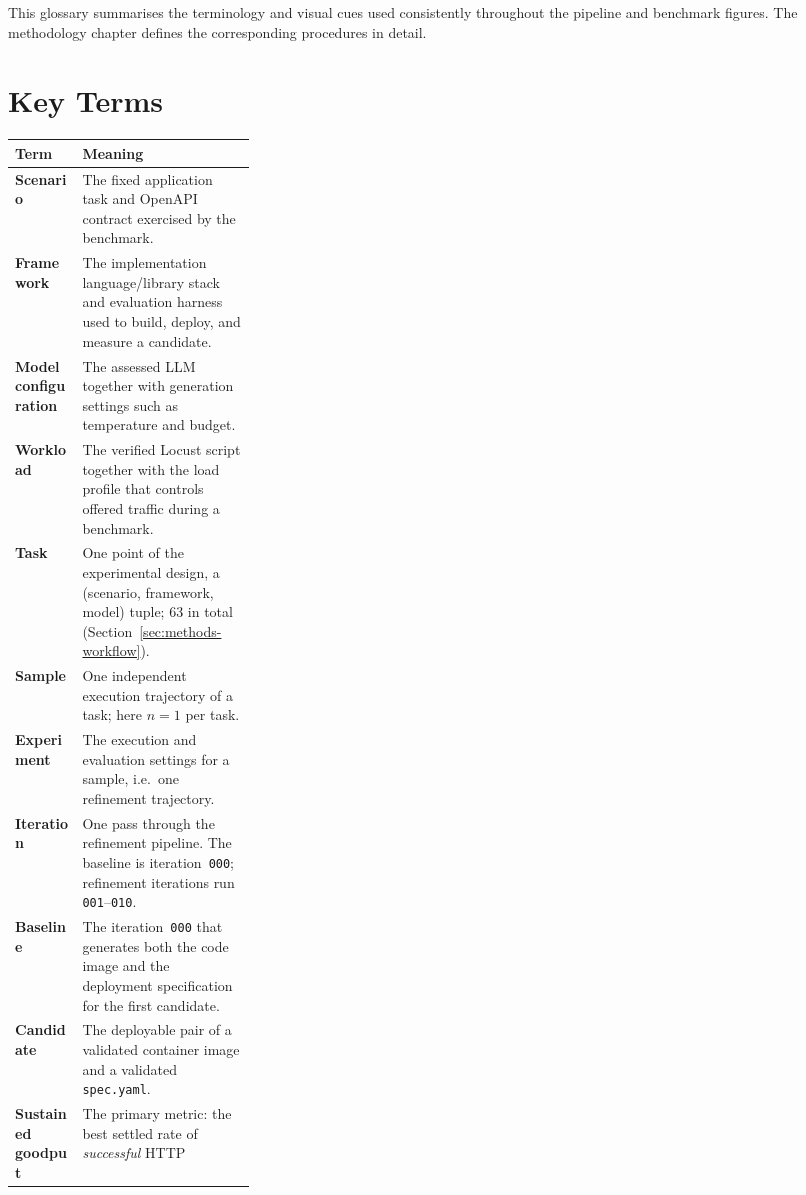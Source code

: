 This glossary summarises the terminology and visual cues used consistently
throughout the pipeline and benchmark figures. The methodology chapter defines
the corresponding procedures in detail.

\section*{Key Terms}

{\footnotesize
\renewcommand{\arraystretch}{1.15}
\begin{tabularx}{\linewidth}{@{}p{0.28\linewidth}X@{}}
  \toprule
  \textbf{Term} & \textbf{Meaning} \\
  \midrule
  \textbf{Scenario} &
    The fixed application task and OpenAPI contract exercised by the
    benchmark. \\
  \rowcolor{gray!12}
  \textbf{Framework} &
    The implementation language/library stack and evaluation harness used to
    build, deploy, and measure a candidate. \\
  \textbf{Model configuration} &
    The assessed LLM together with generation settings such as temperature
    and budget. \\
  \rowcolor{gray!12}
  \textbf{Workload} &
    The verified Locust script together with the load profile that controls
    offered traffic during a benchmark. \\
  \textbf{Task} &
    One point of the experimental design, a
    (scenario, framework, model) tuple; 63 in total
    (Section~\ref{sec:methods-workflow}). \\
  \rowcolor{gray!12}
  \textbf{Sample} &
    One independent execution trajectory of a task; here $n=1$ per task. \\
  \textbf{Experiment} &
    The execution and evaluation settings for a sample, i.e.\ one
    refinement trajectory. \\
  \rowcolor{gray!12}
  \textbf{Iteration} &
    One pass through the refinement pipeline. The baseline is
    iteration~\texttt{000}; refinement iterations run
    \texttt{001}--\texttt{010}. \\
  \textbf{Baseline} &
    The iteration~\texttt{000} that generates both the code image and the
    deployment specification for the first candidate. \\
  \rowcolor{gray!12}
  \textbf{Candidate} &
    The deployable pair of a validated container image and a validated
    \texttt{spec.yaml}. \\
  \textbf{Sustained goodput} &
    The primary metric: the best settled rate of \emph{successful} HTTP

\end{tabularx}}
